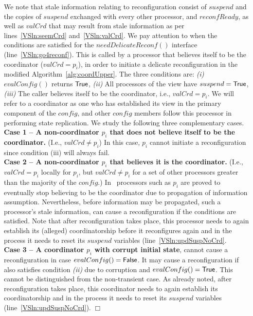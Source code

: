 \documentclass[11pt]{article}
\newenvironment{proof}{\noindent{\bf Proof.}}{\hfill$\Box$}
\begin{document}
\begin{proof}
We note that stale information relating to reconfiguration consist of $suspend$ and the copies of $suspend$ exchanged with every other processor, and $reconfReady$, as well as $valCrd$ that may result from stale information as per lines~\ref{VSln:seemCrd} and~\ref{VSln:valCrd}. 
We pay attention to when the conditions are satisfied for the $needDelicateReconf()$ interface (line~\ref{VSln:go4reconf}). 
This is called by a processor that believes itself to be the coordinator ($valCrd = p_i$), in order to initiate a delicate reconfiguration in the modified Algorithm~\ref{alg:coordUpper}.
The three conditions are:
\emph{(i)} $evalConfig()$ returns $\sf True$,
\emph{(ii)} All processors of the view have $suspend = \sf True$,
\emph{(iii)} The caller believes itself to be the coordinator, i.e., $valCrd = p_i$.
We will refer to a coordinator as one who has established its view in the primary component of the $config$, and other $config$ members follow this processor in performing state replication.
We study the following three complementary cases.\\
{\bf Case 1 -- A non-coordinator $p_i$ that does not believe itself to be the coordinator.} (I.e., $valCrd \neq p_i$) In this case, $p_i$ cannot initiate a reconfiguration since condition (iii) will always fail.\\
{\bf Case 2 -- A non-coordinator $p_i$ that believes it is the coordinator.} (I.e., $valCrd = p_i$ locally for $p_i$, but $valCrd \neq p_i$ for a set of other processors greater than the majority of the $config$.) In~\cite{SSVS} processors such as $p_i$ are proved to eventually stop believing to be the coordinator due to propagation of information assumption.
Nevertheless, before information may be propagated, such a processor's stale information, can cause a reconfiguration if the conditions are satisfied. 
Note that after reconfiguration takes place, this processor needs to again establish its (alleged) coordinatorship before it reconfigures again and in the process it needs to reset its $suspend$ variables (line~\ref{VSln:updSuspNoCrd}.\\
{\bf Case 3 -- A coordinator $p_i$ with corrupt initial state}, cannot cause a reconfiguration in case $evalConfig() = \sf False$. 
It may cause a reconfiguration if also satisfies condition \emph{(ii)} due to corruption and $evalConfig() = \sf True$.
This cannot be distinguished from the non-transient case.
As already noted, after reconfiguration takes place, this coordinator needs to again establish its coordinatorship and in the process it needs to reset its $suspend$ variables (line~\ref{VSln:updSuspNoCrd}).
\end{proof}
\end{document}
